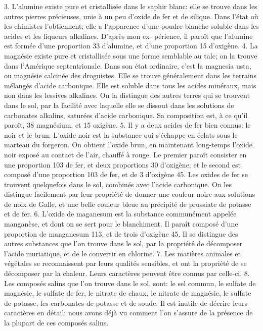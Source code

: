 3. L'alumine existe pure et cristallisée dans le saphir blanc: elle se trouve dans les autres pierres précieuses, unie à un peu d'oxide de fer et de silique. Dans l'état où les chimistes l'obtiennent; elle a l'apparence d'une poudre blanche soluble dans les acides et les liqueurs alkalines. D'après mon ex-\setcounter{page}{417} périence, il paroît que l'alumine est formée d'une proportion 33 d'alumine, et d'une proportion 15 d'oxigène.
4. La magnésie existe pure et cristallisée sous une forme semblable au talc; on la trouve dans l'Amérique septentrionale. Dans son état ordinaire, c'est la magnesia usta, ou magnésie calcinée des droguistes. Elle se trouve généralement dans les terrains mélangés d'acide carbonique. Elle est soluble dans tous les acides minéraux, mais non dans les lessives alkalines. On la distingue des autres terres qui se trouvent dans le sol, par la facilité avec laquelle elle se dissout dans les solutions de carbonates alkalins, saturées d'acide carbonique. Sa composition est, à ce qu'il paroît, 38 magnésium, et 15 oxigène.
5. Il y a deux acides de fer bien connus: le noir et le brun. L'oxide noir est la substance qui s'échappe en éclats sous le marteau du forgeron. On obtient l'oxide brun, en maintenant long-temps l'oxide noir exposé au contact de l'air, chauffé à rouge. Le premier paroît consister en une proportion 103 de fer, et deux proportions 30 d'oxigène; et le second est composé d'une proportion 103 de fer, et de 3 d'oxigène 45. Les oxides de fer se trouvent quelquefois dans le sol, combinés\setcounter{page}{418} avec l'acide carbonique. On les distingue facilement par leur propriété de donner une couleur noire aux solutions de noix de Galle, et une belle couleur bleue au précipité de prussiate de potasse et de fer.
6. L'oxide de maganesum est la substance communément appelée manganèse, et dont on se sert pour le blanchiment. Il paraît composé d'une proportion de manganesum 113, et de trois d'oxigène 45. Il se distingue des autres substances que l'on trouve dans le sol, par la propriété de décomposer l'acide muriatique, et de le convertir en chlorine.
7. Les matières animales et végétales se reconnaissent par leurs qualités sensibles, et ont la propriété de se décomposer par la chaleur. Leurs caractères peuvent être connus par celle-ci.
8. Les composés salins que l'on trouve dans le sol, sont: le sel commun, le sulfate de magnésie, le sulfate de fer, le nitrate de chaux, le nitrate de magnésie, le sulfate de potasse, les carbonates de potasse et de soude. Il est inutile de décrire leurs caractères en détail: nous avons déjà vu comment l'on s'assure de la présence de la plupart de ces composés salins.
